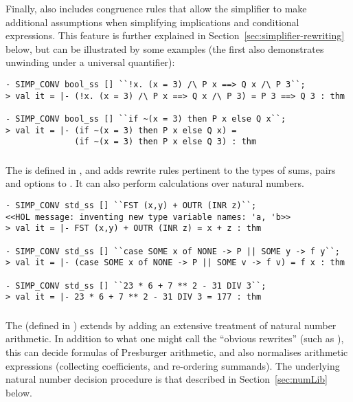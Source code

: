 Finally,  also includes congruence rules that allow
the simplifier to make additional assumptions when simplifying
implications and conditional expressions.  This feature is further
explained in Section~\ref{sec:simplifier-rewriting} below, but can be
illustrated by some examples (the first also demonstrates unwinding
under a universal quantifier):
\begin{session}
\begin{verbatim}
- SIMP_CONV bool_ss [] ``!x. (x = 3) /\ P x ==> Q x /\ P 3``;
> val it = |- (!x. (x = 3) /\ P x ==> Q x /\ P 3) = P 3 ==> Q 3 : thm

- SIMP_CONV bool_ss [] ``if ~(x = 3) then P x else Q x``;
> val it = |- (if ~(x = 3) then P x else Q x) =
              (if ~(x = 3) then P x else Q 3) : thm
\end{verbatim}
\end{session}

\subsubsection{}
%
%
The  \simpset{} is defined in , and adds
rewrite rules pertinent to the types of sums, pairs and options to
.  It can also perform calculations over natural numbers.
\begin{session}
\begin{verbatim}
- SIMP_CONV std_ss [] ``FST (x,y) + OUTR (INR z)``;
<<HOL message: inventing new type variable names: 'a, 'b>>
> val it = |- FST (x,y) + OUTR (INR z) = x + z : thm

- SIMP_CONV std_ss [] ``case SOME x of NONE -> P || SOME y -> f y``;
> val it = |- (case SOME x of NONE -> P || SOME v -> f v) = f x : thm

- SIMP_CONV std_ss [] ``23 * 6 + 7 ** 2 - 31 DIV 3``;
> val it = |- 23 * 6 + 7 ** 2 - 31 DIV 3 = 177 : thm
\end{verbatim}
\end{session}

\subsubsection{}
%
%
The  \simpset{} (defined in ) extends
 by adding an extensive treatment of natural number
arithmetic.  In addition to what one might call the ``obvious
rewrites'' (such as ), this \simpset{} can
decide formulas of Presburger arithmetic, and also normalises
arithmetic expressions (collecting coefficients, and re-ordering
summands).  The underlying natural number decision procedure is that
described in Section~\ref{sec:numLib} below.

